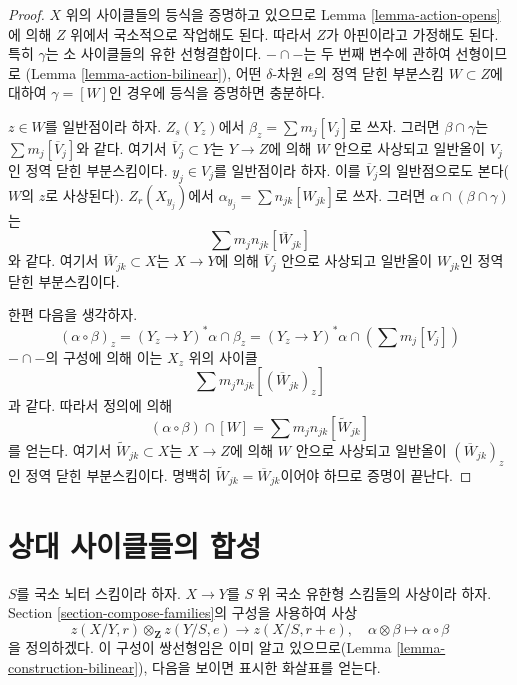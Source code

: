 \begin{proof}
$X$ 위의 사이클들의 등식을 증명하고 있으므로 Lemma
\ref{lemma-action-opens}에 의해 $Z$ 위에서 국소적으로 작업해도 된다.
따라서 $Z$가 아핀이라고 가정해도 된다. 특히 $\gamma$는 소 사이클들의
유한 선형결합이다. $- \cap -$는 두 번째 변수에 관하여 선형이므로
(Lemma \ref{lemma-action-bilinear}), 어떤 $\delta$-차원 $e$의 정역 닫힌
부분스킴 $W \subset Z$에 대하여 $\gamma = [W]$인 경우에 등식을
증명하면 충분하다.

\medskip\noindent
$z \in W$를 일반점이라 하자. $Z_s(Y_z)$에서
$\beta_z = \sum m_j[V_j]$로 쓰자. 그러면 $\beta \cap \gamma$는
$\sum m_j[\overline{V}_j]$와 같다. 여기서
$\overline{V}_j \subset Y$는 $Y \to Z$에 의해 $W$ 안으로 사상되고
일반올이 $V_j$인 정역 닫힌 부분스킴이다. $y_j \in V_j$를 일반점이라
하자. 이를 $\overline{V}_j$의 일반점으로도 본다($W$의 $z$로 사상된다).
$Z_r(X_{y_j})$에서 $\alpha_{y_j} = \sum n_{jk} [W_{jk}]$로 쓰자.
그러면 $\alpha \cap (\beta \cap \gamma)$는
$$
\sum m_j n_{jk} [\overline{W}_{jk}]
$$
와 같다. 여기서 $\overline{W}_{jk} \subset X$는 $X \to Y$에 의해
$\overline{V}_j$ 안으로 사상되고 일반올이 $W_{jk}$인 정역 닫힌
부분스킴이다.

\medskip\noindent
한편 다음을 생각하자.
$$
(\alpha \circ \beta)_z = (Y_z \to Y)^*\alpha \cap \beta_z =
(Y_z \to Y)^*\alpha \cap (\sum m_j [V_j])
$$
$- \cap -$의 구성에 의해 이는 $X_z$ 위의 사이클
$$
\sum m_j n_{jk} [(\overline{W}_{jk})_z]
$$
과 같다. 따라서 정의에 의해
$$
(\alpha \circ \beta) \cap [W] =
\sum m_j n_{jk} [\widetilde{W}_{jk}]
$$
를 얻는다. 여기서 $\widetilde{W}_{jk} \subset X$는 $X \to Z$에 의해
$W$ 안으로 사상되고 일반올이 $(\overline{W}_{jk})_z$인 정역 닫힌
부분스킴이다. 명백히 $\widetilde{W}_{jk} = \overline{W}_{jk}$이어야
하므로 증명이 끝난다.
\end{proof}



\section{상대 사이클들의 합성}
\label{section-compose}

\noindent
$S$를 국소 뇌터 스킴이라 하자. $X \to Y$를 $S$ 위 국소 유한형
스킴들의 사상이라 하자. Section \ref{section-compose-families}의 구성을
사용하여 사상
$$
z(X/Y, r) \otimes_\mathbf{Z} z(Y/S, e) \longrightarrow z(X/S, r + e),\quad
\alpha \otimes \beta \longmapsto \alpha \circ \beta
$$
을 정의하겠다. 이 구성이 쌍선형임은 이미 알고 있으므로(Lemma
\ref{lemma-construction-bilinear}), 다음을 보이면 표시한 화살표를
얻는다.

